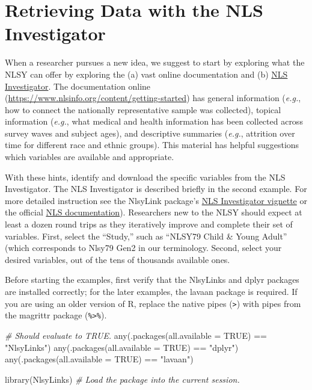 \documentclass[smallextended]{svjour3}       %
\newenvironment{Shaded}{\begin{snugshade}}{\end{snugshade}}
\newcommand{\AttributeTok}[1]{\textcolor[rgb]{0.77,0.63,0.00}{#1}}
\newcommand{\CommentTok}[1]{\textcolor[rgb]{0.56,0.35,0.01}{\textit{#1}}}
\newcommand{\ConstantTok}[1]{\textcolor[rgb]{0.00,0.00,0.00}{#1}}
\newcommand{\FunctionTok}[1]{\textcolor[rgb]{0.00,0.00,0.00}{#1}}
\newcommand{\NormalTok}[1]{#1}
\newcommand{\SpecialCharTok}[1]{\textcolor[rgb]{0.00,0.00,0.00}{#1}}
\newcommand{\StringTok}[1]{\textcolor[rgb]{0.31,0.60,0.02}{#1}}
\begin{document}
\hypertarget{retrieving-data-with-the-nls-investigator}{%
\section{Retrieving Data with the NLS
Investigator}\label{retrieving-data-with-the-nls-investigator}}

When a researcher pursues a new idea, we suggest to start by exploring
what the NLSY can offer by exploring the (a) vast online documentation
and (b) \href{https://www.nlsinfo.org/investigator}{NLS Investigator}.
The documentation online
(\url{https://www.nlsinfo.org/content/getting-started}) has general
information (\emph{e.g.}, how to connect the nationally representative
sample was collected), topical information (\emph{e.g.}, what medical
and health information has been collected across survey waves and
subject ages), and descriptive summaries (\emph{e.g.}, attrition over
time for different race and ethnic groups). This material has helpful
suggestions which variables are available and appropriate.

With these hints, identify and download the specific variables from the
NLS Investigator. The NLS Investigator is described briefly in the
second example. For more detailed instruction see the NlsyLink package's
\href{https://nlsy-links.github.io/NlsyLinks/articles/nls-investigator.html}{NLS
Investigator vignette} or the official
\href{https://www.nlsinfo.org/content/access-data-investigator/investigator-user-guide}{NLS
documentation}). Researchers new to the NLSY should expect at least a
dozen round trips as they iteratively improve and complete their set of
variables. First, select the ``Study,'' such as ``NLSY79 Child \& Young
Adult'' (which corresponds to Nlsy79 Gen2 in our terminology. Second,
select your desired variables, out of the tens of thousands available
ones.

Before starting the examples, first verify that the NlsyLinks and dplyr
packages are installed correctly; for the later examples, the lavaan
package is required. If you are using an older version of R, replace the
native pipes (\texttt{\textbar{}\textgreater{}}) with pipes from the
magrittr package (\texttt{\%\textgreater{}\%}).

\begin{Shaded}
\begin{Highlighting}[]
\CommentTok{\# Should evaluate to TRUE.}
\FunctionTok{any}\NormalTok{(}\FunctionTok{.packages}\NormalTok{(}\AttributeTok{all.available =} \ConstantTok{TRUE}\NormalTok{) }\SpecialCharTok{==} \StringTok{"NlsyLinks"}\NormalTok{)}
\FunctionTok{any}\NormalTok{(}\FunctionTok{.packages}\NormalTok{(}\AttributeTok{all.available =} \ConstantTok{TRUE}\NormalTok{) }\SpecialCharTok{==} \StringTok{"dplyr"}\NormalTok{)}
\FunctionTok{any}\NormalTok{(}\FunctionTok{.packages}\NormalTok{(}\AttributeTok{all.available =} \ConstantTok{TRUE}\NormalTok{) }\SpecialCharTok{==} \StringTok{"lavaan"}\NormalTok{)}

\FunctionTok{library}\NormalTok{(NlsyLinks) }\CommentTok{\# Load the package into the current session.}
\end{Highlighting}
\end{Shaded}
\end{document}
